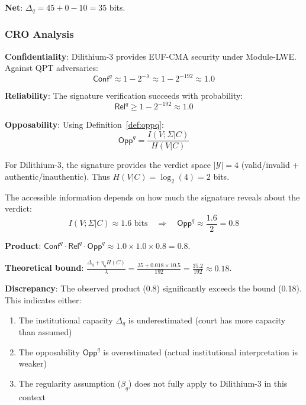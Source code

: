 \documentclass{ieeeaccess}
\newcommand{\Conf}{\mathsf{Conf}}
\newcommand{\Rel}{\mathsf{Rel}}
\newcommand{\Opp}{\mathsf{Opp}}
\begin{document}
\textbf{Net}: $\Delta_q = 45 + 0 - 10 = 35$ bits.

\subsubsection{CRO Analysis}

\textbf{Confidentiality}: Dilithium-3 provides EUF-CMA security under Module-LWE. Against QPT adversaries:
\begin{equation}
    \Conf^q \approx 1 - 2^{-\lambda} \approx 1 - 2^{-192} \approx 1.0
\end{equation}

\textbf{Reliability}: The signature verification succeeds with probability:
\begin{equation}
    \Rel^q \geq 1 - 2^{-192} \approx 1.0
\end{equation}

\textbf{Opposability}: Using Definition~\ref{def:oppq}:
\begin{equation}
    \Opp^q = \frac{I(V; \Sigma|C)}{H(V|C)}
\end{equation}

For Dilithium-3, the signature provides the verdict space $|\mathcal{Y}| = 4$ (valid/invalid + authentic/inauthentic). Thus $H(V|C) = \log_2(4) = 2$ bits.

The accessible information depends on how much the signature reveals about the verdict:
\begin{equation}
    I(V; \Sigma|C) \approx 1.6 \text{ bits} \quad \Rightarrow \quad \Opp^q \approx \frac{1.6}{2} = 0.8
\end{equation}

\textbf{Product}: $\Conf^q \cdot \Rel^q \cdot \Opp^q \approx 1.0 \times 1.0 \times 0.8 = 0.8$.

\textbf{Theoretical bound}: $\frac{\Delta_q + \eta_q H(C)}{\lambda} = \frac{35 + 0.018 \times 10.5}{192} = \frac{35.2}{192} \approx 0.18$.

\textbf{Discrepancy}: The observed product (0.8) significantly exceeds the bound (0.18). This indicates either:
\begin{enumerate}
    \item The institutional capacity $\Delta_q$ is underestimated (court has more capacity than assumed)
    \item The opposability $\Opp^q$ is overestimated (actual institutional interpretation is weaker)
    \item The regularity assumption ($\beta_q$) does not fully apply to Dilithium-3 in this context
\end{enumerate}
\end{document}
